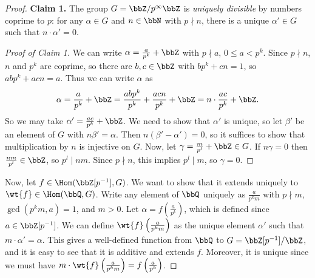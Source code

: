 \begin{proof}
    \textbf{Claim 1.} The group $G=\bbZ\slash p^\infty \bbZ$ is \emph{uniquely divisible} by numbers coprime to $p$: for any $\alpha\in G$ and $n\in\bbN$ with $p\nmid n$, there is a unique $\alpha'\in G$ such that $n\cdot \alpha'=0$.
    \begin{proof}[Proof of Claim 1]
        We can write $\alpha=\frac{a}{p^k}+\bbZ$ with $p\nmid a$, $0\leq a<p^k$. Since $p\nmid n$, $n$ and $p^k$ are coprime, so there are $b,c\in\bbZ$ with $bp^k+cn=1$, so $abp^k+acn=a$. Thus we can write $\alpha$ as
        \[\alpha=\frac{a}{p^k}+\bbZ=\frac{abp^k}{p^k}+\frac{acn}{p^k}+\bbZ=n\cdot\frac{ac}{p^k}+\bbZ.\]
        So we may take $\alpha'=\frac{ac}{p^k}+\bbZ$. We need to show that $\alpha'$ is unique, so let $\beta'$ be an element of $G$ with $n\beta'=\alpha$. Then $n(\beta'-\alpha')=0$, so it suffices to show that multiplication by $n$ is injective on $G$. Now, let $\gamma=\frac{m}{p^l}+\bbZ\in G$. If $n\gamma=0$ then $\frac{nm}{p^l}\in\bbZ$, so $p^l\mid nm$. Since $p\nmid n$, this implies $p^l\mid m$, so $\gamma =0$. 
    \end{proof}
    Now, let $f\in \Hom(\bbZ[p^{-1}],G)$. We want to show that it extends uniquely to $\wt{f}\in\Hom(\bbQ,G)$. Write any element of $\bbQ$ uniquely as $\frac{a}{p^k m}$ with $p\nmid m$, $\gcd(p^km,a)=1$, and $m>0$. Let $\alpha=f\left(\frac{a}{p^k}\right)$, which is defined since $a\in \bbZ[p^{-1}]$. We can define $\wt{f}\left(\frac{a}{p^km}\right)$ as the unique element $\alpha'$ such that $m\cdot \alpha'=\alpha$. This gives a well-defined function from $\bbQ$ to $G=\bbZ[p^{-1}]\slash\bbZ$, and it is easy to see that it is additive and extends $f$. Moreover, it is unique since we must have $m\cdot\wt{f}\left(\frac{a}{p^km}\right)=f\left(\frac{a}{p^k}\right)$.


\end{proof}
